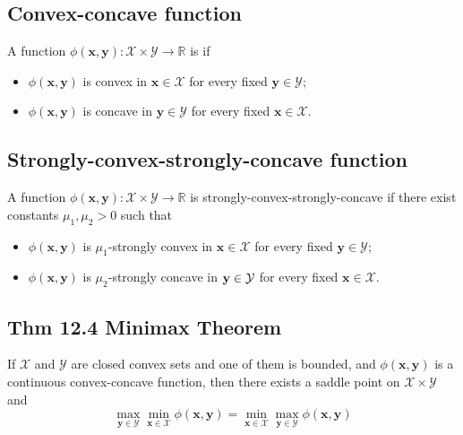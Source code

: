 \subsection*{Convex-concave function}
A function $\phi(\mathbf{x}, \mathbf{y}): \mathcal{X} \times \mathcal{Y} \rightarrow \mathbb{R}$ is  if
\begin{itemize}[leftmargin=*]
    \item $\phi(\mathbf{x}, \mathbf{y})$ is convex in $\mathbf{x} \in \mathcal{X}$ for every fixed $\mathbf{y} \in \mathcal{Y}$;
    \item $\phi(\mathbf{x}, \mathbf{y})$ is concave in $\mathbf{y} \in \mathcal{Y}$ for every fixed $\mathbf{x} \in \mathcal{X}$.
\end{itemize}







\subsection*{Strongly-convex-strongly-concave function}
A function $\phi(\mathbf{x}, \mathbf{y}): \mathcal{X} \times \mathcal{Y} \rightarrow \mathbb{R}$ is strongly-convex-strongly-concave if there exist constants $\mu_{1}, \mu_{2}>0$ such that
\begin{itemize}[leftmargin=*]
    \item $ \phi(\mathbf{x}, \mathbf{y})$ is $\mu_{1}$-strongly convex in $\mathbf{x} \in \mathcal{X}$ for every fixed $\mathbf{y} \in \mathcal{Y}$;
    \item $ \phi(\mathbf{x}, \mathbf{y})$ is $\mu_{2}$-strongly concave in $\operatorname{\boldsymbol{\mathbf{y}}} \in \mathcal{Y}$ for every fixed $\mathbf{x} \in \mathcal{X}$.
\end{itemize}





\subsection*{Thm 12.4 Minimax Theorem}
If $\mathcal{X}$ and $\mathcal{Y}$ are closed convex sets and one of them is bounded, and $\phi(\mathbf{x}, \mathbf{y})$ is a continuous convex-concave function, then there exists a saddle point on $\mathcal{X} \times \mathcal{Y}$ and
$$
\max _{\mathbf{y} \in \mathcal{Y}} \min _{\mathbf{x} \in \mathcal{X}} \phi(\mathbf{x}, \mathbf{y})=\min _{\mathbf{x} \in \mathcal{X}} \max _{\mathbf{y} \in \mathcal{Y}} \phi(\mathbf{x}, \mathbf{y})
$$

